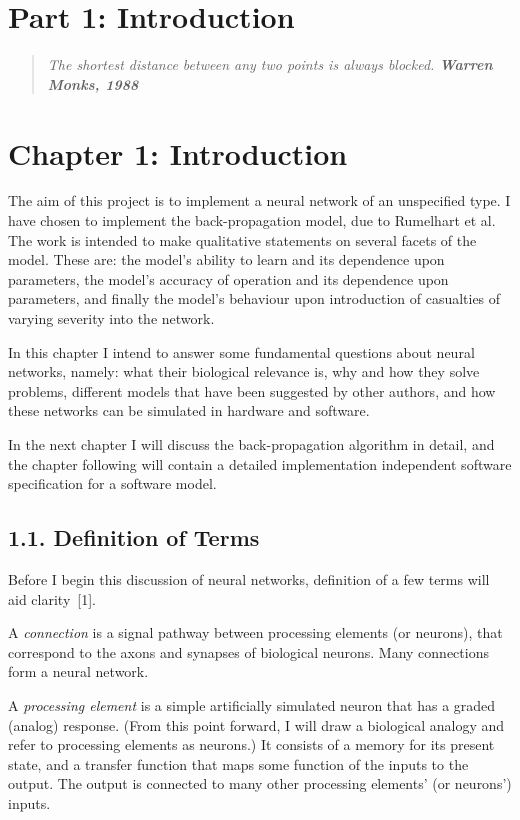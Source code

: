 \documentclass[12pt]{report}
\begin{document}
\chapter*{Part 1: Introduction}

\begin{quote}\textit{The shortest distance between any two points is
always blocked. \textbf{Warren Monks, 1988}}\end{quote}

\chapter{Chapter 1: Introduction}

The aim of this project is to implement a neural network of an unspecified type.
I have chosen to implement the back-propagation model, due to Rumelhart
et al.
The work is intended to make qualitative statements on
several facets of the model.
These are: the model's ability to learn and its dependence upon
parameters, the model's accuracy of operation and its dependence upon
parameters, and finally the model's behaviour upon introduction of
casualties of varying severity into the network.

In this chapter I intend to answer some fundamental questions about
neural networks, namely: what their biological relevance is, why and how
they solve problems, different models that have been suggested by other
authors, and how these networks can be simulated in hardware and
software.

In the next chapter I will discuss the back-propagation algorithm in
detail, and the chapter following will contain a detailed implementation
independent software specification for a software model.

\section{1.1. Definition of Terms}

Before I begin this discussion of neural networks, definition of a few
terms will aid clarity~[1].

A {\sl connection\/} is a signal pathway between processing elements (or
neurons), that correspond to the axons and synapses of biological
neurons.
Many connections form a neural network.

A {\sl processing element\/} is a simple artificially simulated neuron %
that has a graded (analog) response.
(From this point forward, I will draw a biological analogy and refer to
processing elements as neurons.)
It consists of a memory for its present state, and a transfer function
that maps some function of the inputs to the output.
The output is connected to many other processing elements' (or neurons')
inputs.
\end{document}
